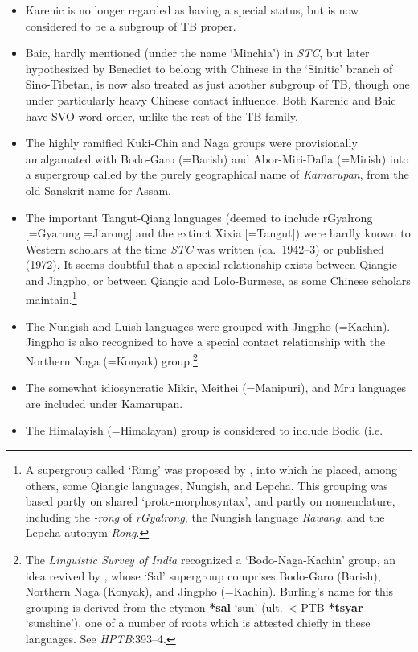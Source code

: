 \begin{itemize}
\item Karenic is no longer regarded as having a special status, but is now
considered to be a subgroup of TB proper.
\item Baic, hardly mentioned (under the name ‘Minchia’) in \textit{STC}, but later
hypothesized by Benedict to belong with Chinese in the ‘Sinitic’ branch of 
Sino-Tibetan, is now also treated as just another subgroup of TB, though one
under particularly heavy Chinese contact influence. Both Karenic and Baic have
SVO word order, unlike the rest of the TB family.
\item The highly ramified Kuki-Chin and Naga groups were provisionally
amalgamated with Bodo-Garo (=Barish) and Abor-Miri-Dafla (=Mirish) into a
supergroup called by the purely geographical name of \textit{Kamarupan}, from the old
Sanskrit name for Assam.
\item The important Tangut-Qiang languages (deemed to include rGyalrong
[=Gyarung =Jiarong] and the extinct Xixia [=Tangut]) were hardly known to Western
scholars at the time \textit{STC} was written (ca.~1942–3) or published (1972). It seems
doubtful that a special relationship exists between Qiangic and Jingpho, or
between Qiangic and Lolo-Burmese, as some Chinese scholars maintain.\footnote{A
supergroup called ‘Rung’ was proposed by \citet{GT-Rung}, into which he placed,
among others, some Qiangic languages, Nungish, and Lepcha. This grouping was
based partly on shared ‘proto-morphosyntax’, and partly on nomenclature,
including the \textit{-rong} of \textit{rGyalrong},
the Nungish language \textit{Rawang}, and the Lepcha autonym \textit{Rong}.}
\item The Nungish and Luish languages were grouped with Jingpho (=Kachin). Jingpho
is also recognized to have a special contact relationship with the Northern Naga
(=Konyak) group.\footnote{The \textit{Linguistic Survey of India}
\citep{LSI} recognized a ‘Bodo-Naga-Kachin’ group,
an idea revived by \citet{RB-Sal}, whose ‘Sal’ supergroup comprises Bodo-Garo (Barish), Northern Naga
(Konyak), and Jingpho (=Kachin). Burling’s name for this grouping is derived
from the etymon \textbf{*sal} ‘sun’ (ult.\ < PTB \textbf{*tsyar} ‘sunshine’), one of a number of
roots which is attested chiefly in these languages. See \textit{HPTB}:393–4.}
\item The somewhat idiosyncratic Mikir, Meithei (=Manipuri), and Mru languages are
included under Kamarupan.
\item The Himalayish (=Himalayan) group is considered to include Bodic (i.e.\

\end{itemize}
